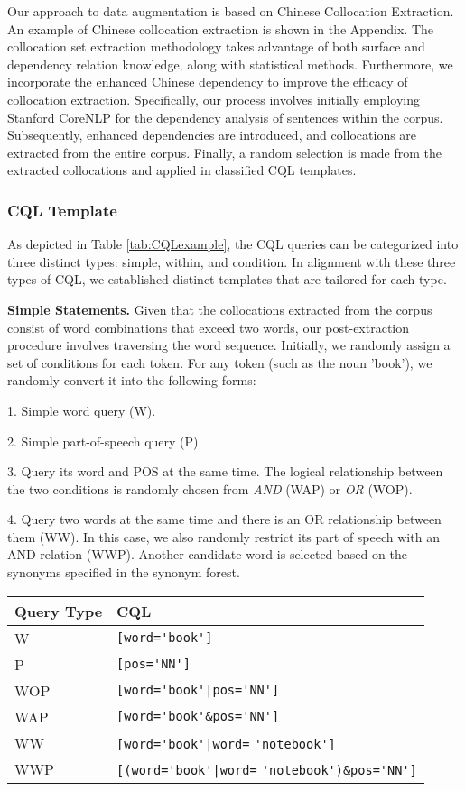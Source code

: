 \documentclass[11pt]{article}
\begin{document}
\begin{CJK*}{UTF8}{gbsn}
Our approach to data augmentation is based on Chinese Collocation Extraction\citep{hucollocation}. An example of Chinese collocation extraction is shown in 
the Appendix.
The collocation set extraction methodology takes advantage of both surface and dependency relation knowledge, along with statistical methods. Furthermore, we incorporate the enhanced Chinese dependency\citep{yujingsi} to improve the efficacy of collocation extraction. Specifically, our process involves initially employing Stanford CoreNLP\citep{corenlp} for the dependency analysis of sentences within the corpus. Subsequently, enhanced dependencies are introduced, and collocations are extracted from the entire corpus. Finally, a random selection is made from the extracted collocations and applied in classified CQL templates.



\subsubsection{CQL Template}
As depicted in Table \ref{tab:CQLexample}, the CQL queries can be categorized into three distinct types: simple, within, and condition. In alignment with these three types of CQL, we established distinct templates that are tailored for each type.

\textbf{Simple Statements. }
Given that the collocations extracted from the corpus consist of word combinations that exceed two words, our post-extraction procedure involves traversing the word sequence.
Initially, we randomly assign a set of conditions for each token. For any token (such as the noun 'book'), we randomly convert it into the following forms:

1. Simple word query (W).

2. Simple part-of-speech query (P).

3. Query its word and POS at the same time. The logical relationship between the two conditions is randomly chosen from \emph{AND} (WAP) or \emph{OR} (WOP).

4. Query two words at the same time and there is an OR relationship between them (WW). In this case, we also randomly restrict its part of speech with an AND relation (WWP). Another candidate word is selected based on the synonyms specified in the synonym forest.
\begin{table}
    \centering
    \begin{tabular}{p{5em}p{12em}} 
    \hline
    \textbf{Query Type} & \textbf{CQL} \\
    \hline
    W& \verb|[word='book']| \\
    P& \verb|[pos='NN']|\\
    WOP& \verb^[word='book'|pos='NN']^\\
    WAP& \verb^[word='book'&pos='NN']^\\
    WW& \verb^[word='book'|word=^ \verb^'notebook']^\\
    WWP& \verb^[(word='book'|word=^ \verb^'notebook')&pos='NN']^\\


\end{tabular}
\end{table}
\end{CJK*}
\end{document}
